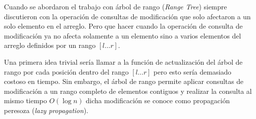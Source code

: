 Cuando se abordaron el trabajo con árbol de rango (\emph{Range Tree}) siempre discutieron con la operación de consultas de modificación que solo afectaron a un solo elemento en el arreglo. Pero que hacer cuando la operación de consulta de modificación ya no afecta solamente a un elemento sino a varios elementos del arreglo definidos por un rango $[l \dots r]$. 

Una primera idea trivial sería llamar a la función de actualización del árbol de rango por cada posición 
dentro del rango $[l \dots r]$ pero esto sería demasiado costoso en tiempo. Sin embargo, el árbol de 
rango permite aplicar consultas de modificación a un rango completo de elementos contiguos y realizar la 
consulta al mismo tiempo $O(\log n)$ dicha modificación se conoce como propagación peresoza (\emph{lazy propagation}).